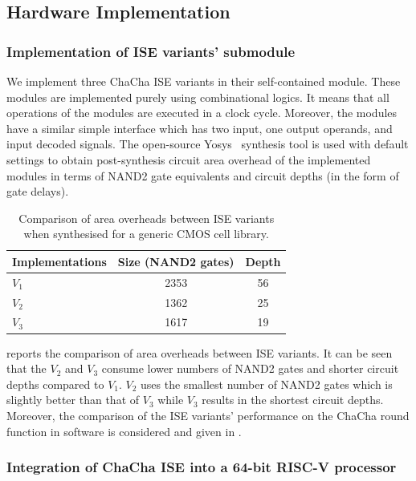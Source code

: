 \subsection{Hardware Implementation}
\subsubsection{Implementation of ISE variants' submodule}
We implement three ChaCha ISE variants in their self-contained module. 
These modules are implemented purely using combinational logics. 
It means that all operations of the modules are executed in a clock cycle. 
Moreover, the modules have a similar simple interface which has two input, one output operands, and input decoded signals.
The open-source Yosys~\cite{Yosys} synthesis tool is used with default settings to obtain post-synthesis circuit area overhead of the implemented modules in terms of NAND2 gate equivalents and circuit depths (in the form of gate delays). 
 
\begin{table}
	\caption{Comparison of area overheads between ISE variants when synthesised for a
		generic CMOS cell library.}
	\centering
	\label{tab:res:hardcost1}
	\begin{tabular}{lcc}
		\toprule            
		Implementations        & Size (NAND2 gates)    & Depth  \\
		
		\midrule
		$V_1$ &     2353     & 56   \\
		$V_2$ &     1362     & 25   \\
		$V_3$ &     1617     & 19   \\
		
		\bottomrule
	\end{tabular}
\end{table}

 reports the comparison of area overheads between ISE variants. It can be seen that the $V_2$ and $V_3$ consume lower numbers of NAND2 gates and shorter circuit depths compared to $V_1$. $V_2$ uses the smallest number of NAND2 gates which is slightly better than that of $V_3$ while $V_3$ results in the shortest circuit depths. Moreover, the comparison of the ISE variants' performance on the ChaCha round function in software is considered and given in .

\subsubsection{Integration of ChaCha ISE into a 64-bit RISC-V processor}
\label{sec:ise:hw:sys}

